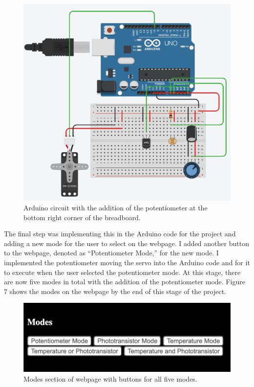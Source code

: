 \documentclass[10pt,twocolumn]{article}
\begin{document}
\begin{figure}
    \centering
    \includegraphics[width=.95\linewidth]{Figure 6.png}
    \caption{
        Arduino circuit with the addition of the potentiometer at the bottom right corner of the breadboard.
    }
    \label{fig:fig6}
\end{figure}

The final step was implementing this in the Arduino code for the project and adding a new mode for the user to select on the webpage. I added another button to the webpage, denoted as “Potentiometer Mode,” for the new mode. I implemented the potentiometer moving the servo into the Arduino code and for it to execute when the user selected the potentiometer mode. At this stage, there are now five modes in total with the addition of the potentiometer mode. Figure 7 shows the modes on the webpage by the end of this stage of the project.

\begin{figure}
    \centering
    \includegraphics[width=.95\linewidth]{Figure 7.png}
    \caption{
        Modes section of webpage with buttons for all five modes. 
    }
    \label{fig:fig7}
\end{figure}
\end{document}
